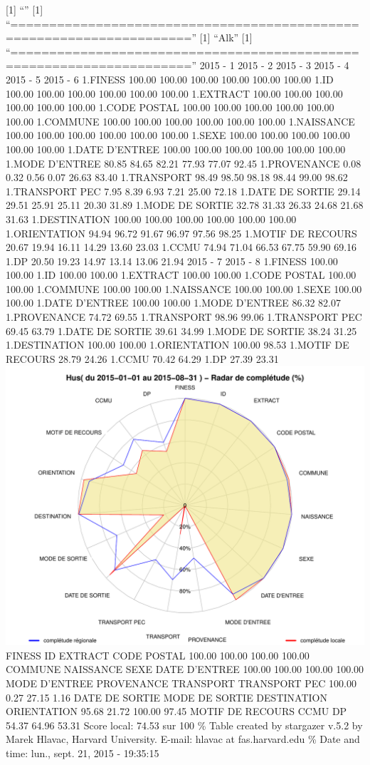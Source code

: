 \documentclass[]{article}
\begin{document}
{[}1{]} ``'' {[}1{]}
``=====================================================================''
{[}1{]} ``Alk'' {[}1{]}
``=====================================================================''
2015 - 1 2015 - 2 2015 - 3 2015 - 4 2015 - 5 2015 - 6 1.FINESS 100.00
100.00 100.00 100.00 100.00 100.00 1.ID 100.00 100.00 100.00 100.00
100.00 100.00 1.EXTRACT 100.00 100.00 100.00 100.00 100.00 100.00 1.CODE
POSTAL 100.00 100.00 100.00 100.00 100.00 100.00 1.COMMUNE 100.00 100.00
100.00 100.00 100.00 100.00 1.NAISSANCE 100.00 100.00 100.00 100.00
100.00 100.00 1.SEXE 100.00 100.00 100.00 100.00 100.00 100.00 1.DATE
D'ENTREE 100.00 100.00 100.00 100.00 100.00 100.00 1.MODE D'ENTREE 80.85
84.65 82.21 77.93 77.07 92.45 1.PROVENANCE 0.08 0.32 0.56 0.07 26.63
83.40 1.TRANSPORT 98.49 98.50 98.18 98.44 99.00 98.62 1.TRANSPORT PEC
7.95 8.39 6.93 7.21 25.00 72.18 1.DATE DE SORTIE 29.14 29.51 25.91 25.11
20.30 31.89 1.MODE DE SORTIE 32.78 31.33 26.33 24.68 21.68 31.63
1.DESTINATION 100.00 100.00 100.00 100.00 100.00 100.00 1.ORIENTATION
94.94 96.72 91.67 96.97 97.56 98.25 1.MOTIF DE RECOURS 20.67 19.94 16.11
14.29 13.60 23.03 1.CCMU 74.94 71.04 66.53 67.75 59.90 69.16 1.DP 20.50
19.23 14.97 13.14 13.06 21.94 2015 - 7 2015 - 8 1.FINESS 100.00 100.00
1.ID 100.00 100.00 1.EXTRACT 100.00 100.00 1.CODE POSTAL 100.00 100.00
1.COMMUNE 100.00 100.00 1.NAISSANCE 100.00 100.00 1.SEXE 100.00 100.00
1.DATE D'ENTREE 100.00 100.00 1.MODE D'ENTREE 86.32 82.07 1.PROVENANCE
74.72 69.55 1.TRANSPORT 98.96 99.06 1.TRANSPORT PEC 69.45 63.79 1.DATE
DE SORTIE 39.61 34.99 1.MODE DE SORTIE 38.24 31.25 1.DESTINATION 100.00
100.00 1.ORIENTATION 100.00 98.53 1.MOTIF DE RECOURS 28.79 24.26 1.CCMU
70.42 64.29 1.DP 27.39 23.31
\includegraphics{completude_files/figure-latex/finess-9.pdf} FINESS ID
EXTRACT CODE POSTAL 100.00 100.00 100.00 100.00 COMMUNE NAISSANCE SEXE
DATE D'ENTREE 100.00 100.00 100.00 100.00 MODE D'ENTREE PROVENANCE
TRANSPORT TRANSPORT PEC 100.00 0.27 27.15 1.16 DATE DE SORTIE MODE DE
SORTIE DESTINATION ORIENTATION 95.68 21.72 100.00 97.45 MOTIF DE RECOURS
CCMU DP 54.37 64.96 53.31 Score local: 74.53 sur 100 \% Table created by
stargazer v.5.2 by Marek Hlavac, Harvard University. E-mail: hlavac at
fas.harvard.edu \% Date and time: lun., sept. 21, 2015 - 19:35:15
\end{document}
